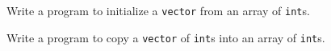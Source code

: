 %
%
\begin{question}
Write a program to initialize a \verb|vector| from an array of \verb|int|s.
\end{question}

\begin{question}
Write a program to copy a \verb|vector| of \verb|int|s into an array of \verb|int|s.
\end{question}

